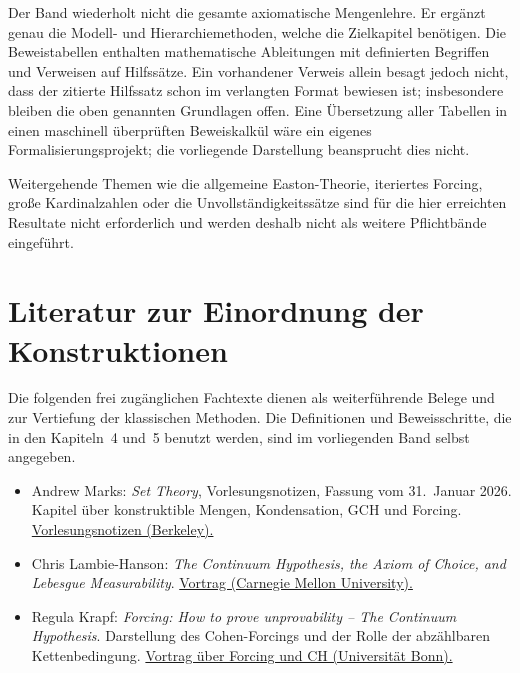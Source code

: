 Der Band wiederholt nicht die gesamte axiomatische Mengenlehre.
Er ergänzt genau die Modell- und Hierarchiemethoden, welche
die Zielkapitel benötigen. Die Beweistabellen enthalten
mathematische Ableitungen mit definierten Begriffen und
Verweisen auf Hilfssätze. Ein vorhandener Verweis allein besagt
jedoch nicht, dass der zitierte Hilfssatz schon im verlangten Format
bewiesen ist; insbesondere bleiben die oben genannten Grundlagen offen.
Eine Übersetzung aller Tabellen in einen maschinell überprüften
Beweiskalkül wäre ein eigenes Formalisierungsprojekt; die
vorliegende Darstellung beansprucht dies nicht.

Weitergehende Themen wie die allgemeine Easton-Theorie,
iteriertes Forcing, große Kardinalzahlen oder die
Unvollständigkeitssätze sind für die hier erreichten Resultate
nicht erforderlich und werden deshalb nicht als weitere
Pflichtbände eingeführt.

\section{Literatur zur Einordnung der Konstruktionen}

Die folgenden frei zugänglichen Fachtexte dienen als
weiterführende Belege und zur Vertiefung der klassischen Methoden.
Die Definitionen und Beweisschritte, die in den Kapiteln~4 und~5
benutzt werden, sind im vorliegenden Band selbst angegeben.

\begin{itemize}
 \item Andrew Marks:
 \emph{Set Theory}, Vorlesungsnotizen, Fassung vom 31.~Januar 2026.
 Kapitel über konstruktible Mengen, Kondensation, GCH und Forcing.
 \href{https://math.berkeley.edu/~marks/notes/set_theory_notes_4.pdf}{Vorlesungsnotizen (Berkeley).}
 \item Chris Lambie-Hanson:
 \emph{The Continuum Hypothesis, the Axiom of Choice, and
 Lebesgue Measurability}.
 \href{https://www.math.cmu.edu/~clambieh/ch.pdf}{Vortrag (Carnegie Mellon University).}
 \item Regula Krapf:
 \emph{Forcing: How to prove unprovability -- The Continuum Hypothesis}.
 Darstellung des Cohen-Forcings und der Rolle der
 abzählbaren Kettenbedingung.
 \href{https://www.math.uni-bonn.de/people/krapf/ForcingCHBielefeld.pdf}{Vortrag über Forcing und CH (Universität Bonn).}
\end{itemize}
